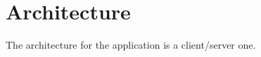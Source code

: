 \chapter{Architecture}
\label{chap:architecture}
The architecture for the application is a client/server one.
